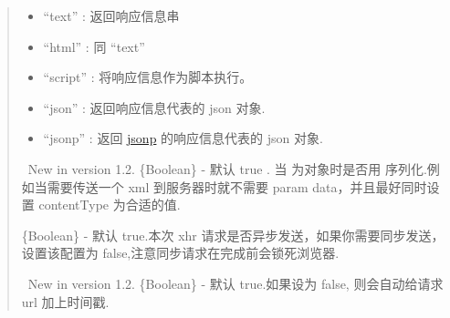 \documentclass[letterpaper,10pt,english]{sphinxmanual}
\begin{document}
\begin{quote}
\begin{fulllineitems}
\begin{itemize}
\item {}
``text'' : 返回响应信息串

\item {}
``html'' : 同 ``text''

\item {}
``script'' : 将响应信息作为脚本执行。

\item {}
``json'' : 返回响应信息代表的 json 对象.

\item {}
``jsonp'' : 返回 \href{http://bob.pythonmac.org/archives/2005/12/05/remote-json-jsonp/}{jsonp} 的响应信息代表的 json 对象.

\end{itemize}

\end{fulllineitems}



\begin{fulllineitems}
\label{api/core/ajax/io:io.cfg.processData}~New in version 1.2.
\{Boolean\} -  默认 true . 当 {\hyperref[api/core/ajax/io:io.cfg.data]{}} 为对象时是否用 {\hyperref[api/seed/lang/param:Lang.KISSY.param]{}} 序列化.例如当需要传送一个 xml 到服务器时就不需要 param data，并且最好同时设置 contentType 为合适的值.

\end{fulllineitems}



\begin{fulllineitems}
\label{api/core/ajax/io:io.cfg.async}
\{Boolean\} - 默认 true.本次 xhr 请求是否异步发送，如果你需要同步发送，设置该配置为 false,注意同步请求在完成前会锁死浏览器.

\end{fulllineitems}



\begin{fulllineitems}
\label{api/core/ajax/io:io.cfg.cache}~New in version 1.2.
\{Boolean\} -  默认 true.如果设为 false, 则会自动给请求 url 加上时间戳.

\end{fulllineitems}




\end{quote}
\end{document}
